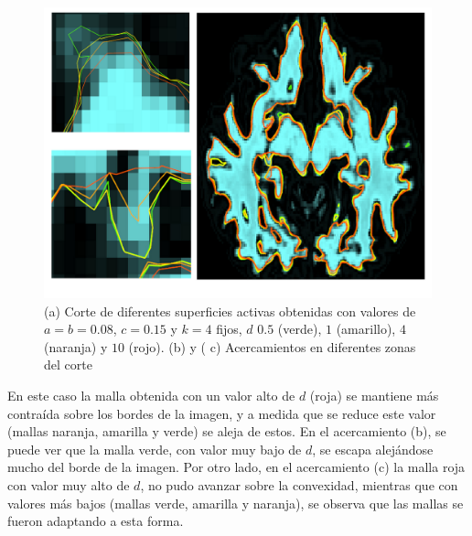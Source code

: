 \begin{figure}[H]
	\centering
	\includegraphics[scale=0.05]{images/sensibilidad6.jpg}
	\caption{(a) Corte de diferentes superficies activas obtenidas con valores de $a=b=0.08$, $c=0.15$ y $k=4$ fijos, $d$ $0.5$ (verde), $1$ (amarillo), $4$ (naranja) y $10$ (rojo). (b) y ( c) Acercamientos en diferentes zonas del corte}
	\label{fig:sensibilidad6}
\end{figure}

En este caso la malla obtenida con un valor alto de $d$ (roja) se mantiene más contraída sobre los bordes de la imagen, y a medida que se reduce este valor (mallas naranja, amarilla y verde) se aleja de estos. En el acercamiento (b), se puede ver que la malla verde, con valor muy bajo de $d$, se escapa alejándose mucho del borde de la imagen. Por otro lado, en el acercamiento (c) la malla roja con valor muy alto de $d$, no pudo avanzar sobre la convexidad, mientras que con valores más bajos (mallas verde, amarilla y naranja), se observa que las mallas se fueron adaptando a esta forma.
